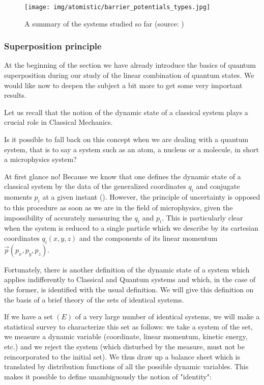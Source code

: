 	\begin{figure}[H]
		\centering
		\texttt{[image: img/atomistic/barrier\_potentials\_types.jpg]}	
		\caption[]{A summary of the systems studied so far (source: \cite{eisberg1985quantum})}
	\end{figure}
	
	\pagebreak
	\subsubsection{Superposition principle}
	At the beginning of the section we have already introduce the basics of quantum superposition during our study of the linear combination of quantum states. We would like now to deepen the subject a bit more to get some very important results.

	Let us recall that the notion of the dynamic state of a classical system plays a crucial role in Classical Mechanics.

	Is it possible to fall back on this concept when we are dealing with a quantum system, that is to say a system such as an atom, a nucleus or a molecule, in short a microphysics system?
	
	At first glance no! Because we know that one defines the dynamic state of a classical system by the data of the generalized coordinates $q_i$ and conjugate moments $p_i$ at a given instant (). However, the principle of uncertainty is opposed to this procedure as soon as we are in the field of microphysics, given the impossibility of accurately measuring the $q_i$ and $p_i$. This is particularly clear when the system is reduced to a single particle which we describe by its cartesian coordinates $q_i(x,y,z)$ and the components of its linear momentum $\vec{p}(p_x,p_y,p_z)$.

	Fortunately, there is another definition of the dynamic state of a system which applies indifferently to Classical and Quantum systems and which, in the case of the former, is identified with the usual definition. We will give this definition on the basis of a brief theory of the sets of identical systems.
	
	If we have a set $(E)$ of a very large number of identical systems, we will make a statistical survey to characterize this set as follows: we take a system of the set, we measure a dynamic variable (coordinate, linear momentum, kinetic energy, etc.) and we reject the system (which disturbed by the measure, must not be reincorporated to the initial set). We thus draw up a balance sheet which is translated by distribution functions of all the possible dynamic variables. This makes it possible to define unambiguously the notion of "identity":
	
